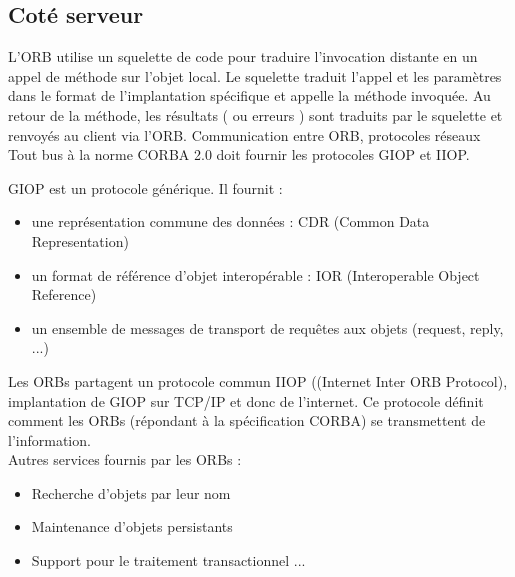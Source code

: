         \subsection*{Coté serveur}
            L'ORB utilise un squelette de code pour traduire l'invocation distante en un appel de méthode sur l'objet local. Le squelette traduit l'appel et les paramètres dans le format de l'implantation spécifique et appelle la méthode invoquée.
            Au retour de la méthode, les résultats ( ou erreurs ) sont traduits par le squelette et renvoyés au client via l'ORB.
            Communication entre ORB, protocoles réseaux
            Tout bus à la norme CORBA 2.0 doit fournir les protocoles GIOP et IIOP.
            
            GIOP est un protocole générique. Il fournit :
            \begin{itemize}[label= $\bullet$]
                \item une représentation commune des données : CDR (Common Data Representation)
                \item un format de référence d'objet interopérable : IOR (Interoperable Object Reference)
                \item un ensemble de messages de transport de requêtes aux objets (request, reply, ...)
            \end{itemize}

            \par Les ORBs partagent un protocole commun IIOP ((Internet Inter ORB Protocol), implantation de GIOP sur TCP/IP et donc de l'internet. Ce protocole définit comment les ORBs (répondant à la spécification CORBA) se transmettent de l'information.\\
            
            Autres services fournis par les ORBs :
            \begin{itemize}[label= $\bullet$]
                \item Recherche d'objets par leur nom
                \item Maintenance d'objets persistants
                \item Support pour le traitement transactionnel ...
            \end{itemize}

            

    
    